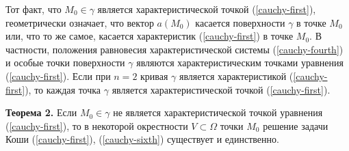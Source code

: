 \par \Note Тот факт, что $M_0 \in \gamma$ является характеристической точкой (\ref{cauchy-first}), геометрически означает, что вектор $a(M_0)$ касается поверхности $\gamma$ в точке $M_0$
или, что то же самое, касается характеристик (\ref{cauchy-first}) в точке $M_0$. В частности, положения равновесия характеристической системы (\ref{cauchy-fourth}) и особые точки поверхности $\gamma$ являются характеристическим точками уравнения (\ref{cauchy-first}). Если при $n=2$ кривая $\gamma$ является характеристикой (\ref{cauchy-first}), то каждая точка $\gamma$ является характеристической точкой (\ref{cauchy-first}).

\par \textbf{Теорема 2.} Если $M_0 \in \gamma$ не является характеристической точкой уравнения (\ref{cauchy-first}), то в некоторой окрестности $V \subset \Omega$ точки $M_0$ решение задачи
Коши (\ref{cauchy-first}), (\ref{cauchy-sixth}) существует и единственно.

